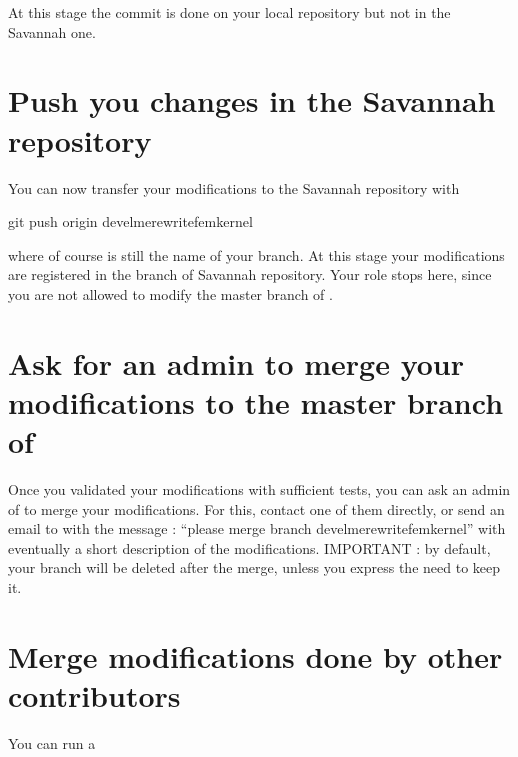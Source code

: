 \documentclass[a4paper,11pt,english]{sphinxmanual}
\begin{document}
At this stage the commit is done on your local repository but not in the Savannah one.


\section{Push you changes in the Savannah repository}
\label{\detokenize{project/contribute:push-you-changes-in-the-savannah-repository}}
You can now transfer your modifications to the Savannah repository with

\begin{sphinxVerbatim}[commandchars=\\\{\}]
git push origin devel\PYGZhy{}me\PYGZhy{}rewrite\PYGZhy{}fem\PYGZhy{}kernel
\end{sphinxVerbatim}

where of course  is still the name of your branch. At this stage your modifications are registered in the branch  of Savannah repository.
Your role stops here, since you are not allowed to modify the master branch of .


\section{Ask for an admin to merge your modifications to the master branch of }
\label{\detokenize{project/contribute:ask-for-an-admin-to-merge-your-modifications-to-the-master-branch-of-gf}}
Once you validated your modifications with sufficient tests, you can ask an admin of  to merge your modifications. For this, contact one of them directly, or send an e\sphinxhyphen{}mail to  with the message : “please merge branch devel\sphinxhyphen{}me\sphinxhyphen{}rewrite\sphinxhyphen{}fem\sphinxhyphen{}kernel” with eventually a short description of the modifications. IMPORTANT : by default, your branch will be deleted after the merge, unless you express the need to keep it.


\section{Merge modifications done by other contributors}
\label{\detokenize{project/contribute:merge-modifications-done-by-other-contributors}}
You can run a
\end{document}
